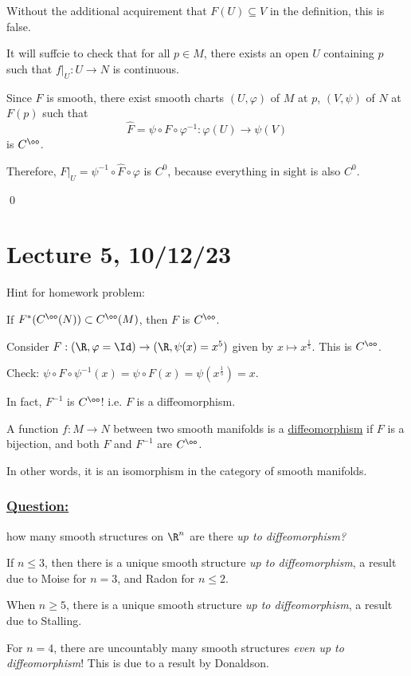 \documentclass[x11names,reqno,14pt]{extarticle}
\renewcommand{\phi}{\varphi}
\begin{document}
Without the additional acquirement that $F(U) \subseteq V$ in the definition, this is false. 

It will suffcie to check that for all $p \in M$, there exists an open $U$ containing $p$ such that $f|_U:U\to N$ is continuous. 

Since $F$ is smooth, there exist smooth charts $(U, \phi)$ of $M$ at $p$, $(V,\psi)$ of $N$ at $F(p)$ such that
\[
\hat{F} = \psi\circ F\circ\phi^{-1}:\phi(U)\to\psi(V)
\]
is $C^\oo$. 

Therefore, $F|_U = \psi^{-1} \circ \hat{F} \circ \phi$ is $C^0$, because everything in sight is also $C^0$. 

\qed

\section*{Lecture 5, 10/12/23}

Hint for homework problem:

If $F^*(C^\oo(N)) \subset C^\oo(M)$, then $F$ is $C^\oo$. 

\exm

Consider $F:(\R,\phi=\Id) \to (\R, \psi(x) = x^5)$ given by $x \mapsto x^\frac15$. This is $C^\oo$. 

Check: $\psi \circ F \circ \psi^{-1}(x) = \psi\circ F(x) = \psi(x^\frac15) = x$. 

In fact, $F^{-1}$ is $C^\oo$! i.e. $F$ is a diffeomorphism. 


A function $f:M\to N$ between two smooth manifolds is a \underline{diffeomorphism} if $F$ is a bijection, and both $F$ and $F^{-1}$ are $C^\oo$. 

In other words, it is an isomorphism in the category of smooth manifolds. 

\subsubsection*{\underline{Question:}} how many smooth structures on $\R^n$ are there \textit{up to diffeomorphism?}

If $n \leq 3$, then there is a unique smooth structure \textit{up to diffeomorphism}, a result due to Moise for $n = 3$, and Radon for $n \leq 2$. 

When $n \geq 5$, there is a unique smooth structure \textit{up to diffeomorphism}, a result due to Stalling. 

For $n = 4$, there are uncountably many smooth structures \textit{even up to diffeomorphism}! This is due to a result by Donaldson.
\end{document}

